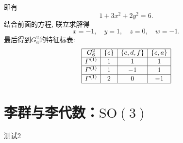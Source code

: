 \documentclass[UTF8]{ctexart}
\begin{document}
即有
\begin{equation}
  1 + 3x^2 + 2y^2 = 6.
\end{equation}
结合前面的方程, 联立求解得
\begin{equation}
  x = -1, \quad y = 1, \quad z = 0, \quad w = -1.
\end{equation}
最后得到$G_6^2$的特征标表:
\begin{equation}
  \begin{array}{|c|c|c|c|}
    \hline
    G_6^2 & \{e\} & \{e, d, f\} & \{e, a\} \\
    \hline
    \varGamma^{(1)} & 1 & 1 & 1 \\
    \hline
    \varGamma^{(1)} & 1 & -1 & 1 \\
    \hline
    \varGamma^{(1)} & 2 & 0 & -1 \\
    \hline
  \end{array}
\end{equation}
\section{李群与李代数：$\mathrm{SO}(3)$}
测试2
\end{document}
